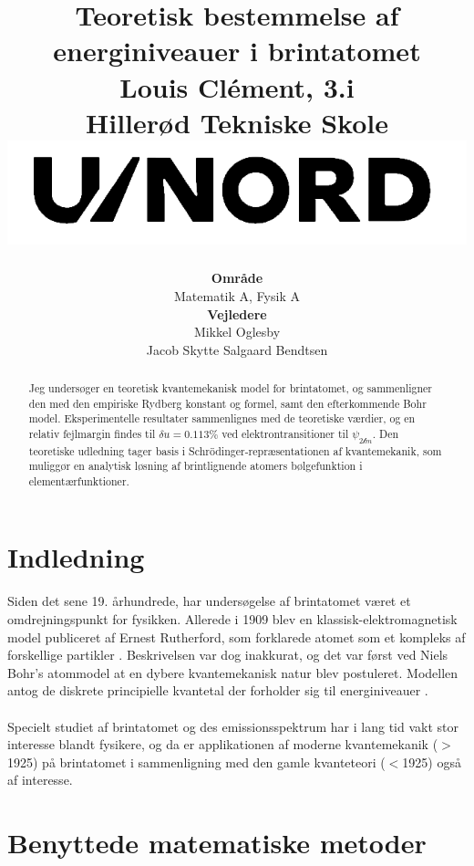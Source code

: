 \documentclass[12pt]{article}
\title{
  {{Teoretisk bestemmelse af energiniveauer i brintatomet}}\\
  {\large{Louis Clément, 3.i}}\\
  {\large Hillerød Tekniske Skole}\\
  \vspace{2cm}
  {\includegraphics[scale=1.5]{gym.png}}
  \vspace*{1.5cm}
}
\author{
  \begin{tabular}[!h]{c}
    \textbf{Område}\\
                Matematik A, Fysik A \\
    \textbf{Vejledere}\\
                 Mikkel Oglesby \\ Jacob Skytte Salgaard Bendtsen
  \end{tabular}
}
\date{\vspace*{1cm}{18. december 2020}}
\theoremstyle{definition}
\theoremstyle{remark}
\theoremstyle{definition}
\numberwithin{equation}{section}
\begin{document}
\maketitle
\newpage
\begin{abstract}
\noindent 
    Jeg undersøger en teoretisk kvantemekanisk model for brintatomet, og sammenligner den med den empiriske Rydberg konstant og formel, samt den efterkommende Bohr model. Eksperimentelle resultater sammenlignes med de teoretiske værdier, og en relativ fejlmargin findes til $\delta u = 0.113\%$ ved elektrontransitioner til $\psi_{2\mathscr l m}$. Den teoretiske udledning tager basis i Schrödinger-repræsentationen af kvantemekanik, som muliggør en analytisk løsning af brintlignende atomers bølgefunktion i elementærfunktioner.
\end{abstract}

\tableofcontents

\newpage
\setcounter{page}{1}

\section{Indledning}
Siden det sene 19. århundrede, har undersøgelse af brintatomet været et omdrejningspunkt for fysikken. Allerede i 1909 blev en klassisk-elektromagnetisk model publiceret af Ernest Rutherford, som forklarede atomet som et kompleks af forskellige partikler \parencite{olsenclassical}. Beskrivelsen var dog inakkurat, og det var først ved Niels Bohr's atommodel at en dybere kvantemekanisk natur blev postuleret. Modellen antog de diskrete principielle kvantetal der forholder sig til energiniveauer \parencite{olsenclassical}.
\\\\
Specielt studiet af brintatomet og des emissionsspektrum har i lang tid vakt stor interesse blandt fysikere, og da er applikationen af moderne kvantemekanik ($>$1925) på brintatomet i sammenligning med den gamle kvanteteori ($<$1925) også af interesse.

\section{Benyttede matematiske metoder}
\end{document}

